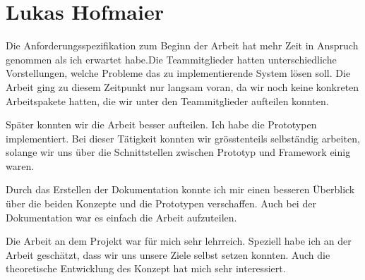 
\section{Lukas Hofmaier}


Die Anforderungsspezifikation zum Beginn der Arbeit hat mehr Zeit in Anspruch genommen als ich erwartet habe.Die Teammitglieder hatten unterschiedliche Vorstellungen, welche Probleme das zu implementierende System lösen soll. Die Arbeit ging zu diesem Zeitpunkt nur langsam voran, da wir noch keine konkreten Arbeitspakete hatten, die wir unter den Teammitglieder aufteilen konnten.

Später konnten wir die Arbeit besser aufteilen. Ich habe die Prototypen implementiert. Bei dieser Tätigkeit konnten wir grösstenteils selbständig arbeiten, solange wir uns über die Schnittstellen zwischen Prototyp und Framework einig waren. 

Durch das Erstellen der Dokumentation konnte ich mir einen besseren Überblick über die beiden Konzepte und die Prototypen verschaffen.
Auch bei der Dokumentation war es einfach die Arbeit aufzuteilen. 

Die Arbeit an dem Projekt war für mich sehr lehrreich. Speziell habe ich an der Arbeit geschätzt, dass wir uns unsere Ziele selbst setzen konnten. Auch die theoretische Entwicklung des Konzept hat mich sehr interessiert. 